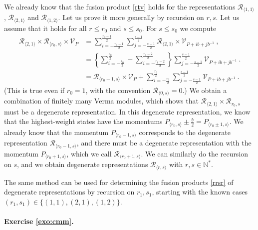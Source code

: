 \documentclass[12pt, a4paper]{article}
\theoremstyle{break}
\begin{document}
We already know that the fusion product \eqref{rtv} holds for the representations $\mathcal{R}_{\langle 1,1\rangle}$, $\mathcal{R}_{\langle 2,1\rangle}$ and $\mathcal{R}_{\langle 1,2\rangle}$. Let us prove it more generally by recursion on $r,s$. Let us assume that it holds for all $r\leq r_0$ and $s\leq s_0$. For $s\leq s_0$ we compute 
\begin{align}
 \mathcal{R}_{\langle 2,1\rangle} \times \mathcal{R}_{\langle r_0, s\rangle} \times \mathcal{V}_P 
 &= \sum_{i=-\frac{r_0-1}{2}}^{\frac{r_0-1}{2}} 
 \sum_{j=-\frac{s-1}{2}}^{\frac{s-1}{2}}  
 \mathcal{R}_{\langle 2,1\rangle} \times \mathcal{V}_{P + ib+jb^{-1}} \ ,
 \\
 &= \left\{\sum_{i=-\frac{r_0}{2}}^{\frac{r_0}{2}} + \sum_{i=-\frac{r_0-2}{2}}^{\frac{r_0-2}{2}} \right\}
 \sum_{j=-\frac{s-1}{2}}^{\frac{s-1}{2}} \mathcal{V}_{P + ib+jb^{-1}} \ .
 \\
 &= \mathcal{R}_{\langle r_0-1,s\rangle} \times \mathcal{V}_P + \sum_{i=-\frac{r_0}{2}}^{\frac{r_0}{2}}\sum_{j=-\frac{s-1}{2}}^{\frac{s-1}{2}} \mathcal{V}_{P + ib+jb^{-1}} \ .
\end{align}
(This is true even if $r_0=1$, with the convention $\mathcal{R}_{\langle 0,s\rangle}=0$.) We obtain a combination of finitely many Verma modules, which shows that $\mathcal{R}_{\langle 2,1\rangle} \times \mathcal{R}_{r_0, s} $ must be a degenerate representation. In this degenerate representation, we know that the highest-weight states have the momentums $P_{\langle r_0, s\rangle} \pm \frac{b}{2} = P_{\langle r_0\pm 1,s\rangle}$. We already know that the momentum $P_{\langle r_0-1,s\rangle}$ corresponds to the degenerate representation $\mathcal{R}_{\langle r_0-1,s\rangle}$, and there must be a degenerate representation with the momentum  $P_{\langle r_0+1,s\rangle}$, which we call $\mathcal{R}_{\langle r_0+1,s\rangle}$. We can similarly do the recursion on $s$, and we obtain degenerate representations $\mathcal{R}_{\langle r,s\rangle}$ with $r,s\in\mathbb{N}^*$.

The same method can be used for determining the fusion products \eqref{rrsr} of degenerate representations by recursion on $r_1,s_1$, starting with the known cases $(r_1,s_1)\in \{(1,1), (2,1), (1,2)\}$.

\paragraph{Exercise \ref{exo:cmm}.} 
\end{document}
